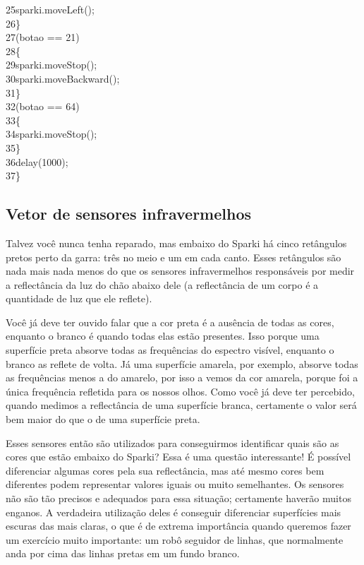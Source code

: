 \documentclass[conference]{IEEEtran}
\begin{document}
{    {\color{gray}25}\quad\quad\quad sparki.moveLeft();\\
    {\color{gray}26}\quad\quad \}\\
    {\color{gray}27}\quad{}(botao == 21)\\
    {\color{gray}28}\quad\quad \{\\
    {\color{gray}29}\quad\quad\quad sparki.moveStop();\\
    {\color{gray}30}\quad\quad\quad sparki.moveBackward();\\
    {\color{gray}31}\quad\quad \}\\
    {\color{gray}32}\quad{}(botao == 64)\\
    {\color{gray}33}\quad\quad \{\\
    {\color{gray}34}\quad\quad\quad sparki.moveStop();\\
    {\color{gray}35}\quad\quad \}\\
    {\color{gray}36}\quad\quad delay(1000);\\
    {\color{gray}37}\quad\}\\
}
\begin{center}
    \subsection{Vetor de sensores infravermelhos}
\end{center}
\par
Talvez você nunca tenha reparado, mas embaixo do Sparki há cinco retângulos pretos perto da garra: três no meio e um em cada canto. Esses retângulos são nada mais nada menos do que os sensores infravermelhos responsáveis por medir a reflectância da luz do chão abaixo dele (a reflectância de um corpo é a quantidade de luz que ele reflete).
\par
Você já deve ter ouvido falar que a cor preta é a ausência de todas as cores, enquanto o branco é quando todas elas estão presentes. Isso porque uma superfície preta absorve todas as frequências do espectro visível, enquanto o branco as reflete de volta. Já uma superfície amarela, por exemplo, absorve todas as frequências menos a do amarelo, por isso a vemos da cor amarela, porque foi a única frequência refletida para os nossos olhos. Como você já deve ter percebido, quando medimos a reflectância de uma superfície branca, certamente o valor será bem maior do que o de uma superfície preta.
\par
Esses sensores então são utilizados para conseguirmos identificar quais são as cores que estão embaixo do Sparki? Essa é uma questão interessante! É possível diferenciar algumas cores pela sua reflectância, mas até mesmo cores bem diferentes podem representar valores iguais ou muito semelhantes. Os sensores não são tão precisos e adequados para essa situação; certamente haverão muitos enganos. A verdadeira utilização deles é conseguir diferenciar superfícies mais escuras das mais claras, o que é de extrema importância quando queremos fazer um exercício muito importante: um robô seguidor de linhas, que normalmente anda por cima das linhas pretas em um fundo branco.
\end{document}
